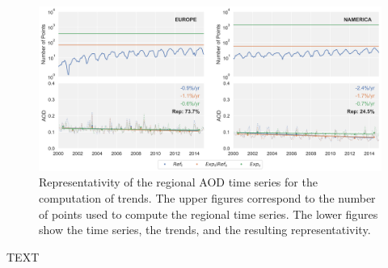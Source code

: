 \documentclass[journal abbreviation, manuscript]{copernicus}
\begin{document}


\begin{figure}[t]
 \includegraphics[width=16cm]{../scripts/figs/representativity.png}
 \caption{Representativity of the regional AOD time series for the computation of trends. The upper figures correspond to the number of points used to compute the regional time series. The lower figures show the time series, the trends, and the resulting representativity.}
 \label{fig:representativity}
\end{figure}

\appendixfigures  %

\appendixtables   %







\begin{acknowledgements}
 TEXT
\end{acknowledgements}






\end{document}
